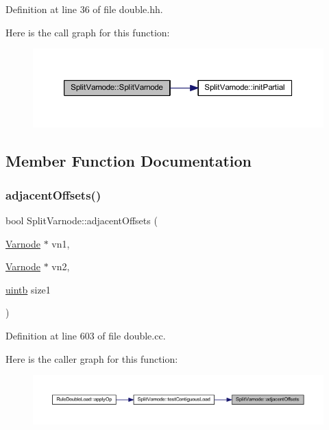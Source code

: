 Definition at line 36 of file double.\+hh.

Here is the call graph for this function\+:
\nopagebreak
\begin{figure}[H]
\begin{center}
\leavevmode
\includegraphics[width=350pt]{class_split_varnode_a9a0d2cdc707d94e0fca72a2066593916_cgraph}
\end{center}
\end{figure}


\subsection{Member Function Documentation}
\mbox{\label{class_split_varnode_a575ad9769e03bfa8abbaf398f5952af4}} 
\subsubsection{\texorpdfstring{adjacentOffsets()}{adjacentOffsets()}}
{\footnotesize\ttfamily bool Split\+Varnode\+::adjacent\+Offsets (\begin{DoxyParamCaption}\item[{\mbox{\hyperlink{class_varnode}{Varnode}} $\ast$}]{vn1,  }\item[{\mbox{\hyperlink{class_varnode}{Varnode}} $\ast$}]{vn2,  }\item[{\mbox{\hyperlink{types_8h_a2db313c5d32a12b01d26ac9b3bca178f}{uintb}}}]{size1 }\end{DoxyParamCaption})\hspace{0.3cm}{\ttfamily [static]}}



Definition at line 603 of file double.\+cc.

Here is the caller graph for this function\+:
\nopagebreak
\begin{figure}[H]
\begin{center}
\leavevmode
\includegraphics[width=350pt]{class_split_varnode_a575ad9769e03bfa8abbaf398f5952af4_icgraph}
\end{center}
\end{figure}
\mbox{\label{class_split_varnode_a07d18e3a13c7be35cd42f1762214d3f8}} 
